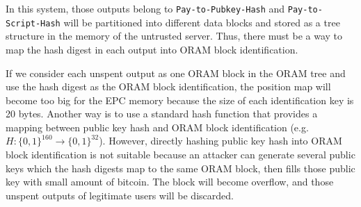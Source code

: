 In this system, those outputs belong to \texttt{Pay-to-Pubkey-Hash} and \texttt{Pay-to-Script-Hash} will be partitioned into different data blocks and stored as a tree structure in the memory of the untrusted server. 
Thus, there must be a way to map the hash digest in each output into ORAM block identification.

If we consider each unspent output as one ORAM block in the ORAM tree and use the hash digest as the ORAM block identification, the position map will become too big for the EPC memory because the size of each identification key is 20 bytes.
Another way is to use a standard hash function that provides a mapping between public key hash and ORAM block identification (e.g. $H:\{0,1\}^{160} \rightarrow \{0,1\}^{32}$). However, directly hashing public key hash into ORAM block identification is not suitable because an attacker can generate several public keys which the hash digests map to the same ORAM block, then fills those public key with small amount of bitcoin. 
The block will become overflow, and those unspent outputs of legitimate users will be discarded.

